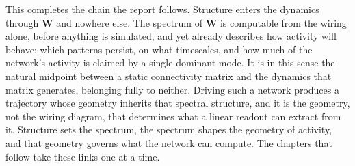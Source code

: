 This completes the chain the report follows. Structure enters the dynamics through $\mathbf{W}$ and
nowhere else. The spectrum of $\mathbf{W}$ is computable from the wiring alone, before anything is
simulated, and yet already describes how activity will behave: which patterns persist, on what
timescales, and how much of the network's activity is claimed by a single dominant mode. It is in
this sense the natural midpoint between a static connectivity matrix and the dynamics that matrix
generates, belonging fully to neither. Driving such a network produces a trajectory whose geometry
inherits that spectral structure, and it is the geometry, not the wiring diagram, that determines
what a linear readout can extract from it. Structure sets the spectrum, the spectrum shapes the
geometry of activity, and that geometry governs what the network can compute. The chapters that
follow take these links one at a time.




\afterpage{\blankpage}